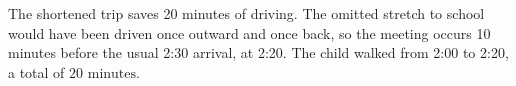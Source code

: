 The shortened trip saves 20 minutes of driving. The omitted stretch to school would have been driven once outward and once back, so the meeting occurs 10 minutes before the usual 2:30 arrival, at 2:20. The child walked from 2:00 to 2:20, a total of $\boxed{20\text{ minutes}}$.
